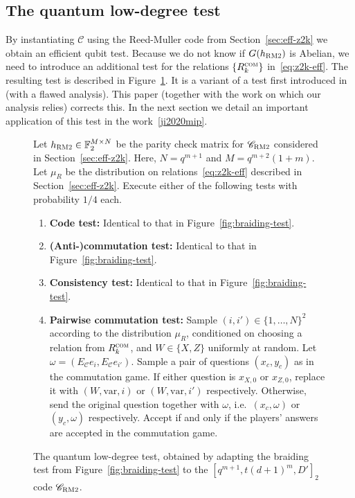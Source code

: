 \documentclass[11pt]{article}
\theoremstyle{definition}
\newcommand{\code}{\mathscr{C}}
\newcommand{\F}{\ensuremath{\mathbb{F}}}
\newcommand{\com}{\textsc{com}}
\newcommand{\bRM}{\ensuremath{\textsc{RM2}}}
\newcommand{\var}{\mathrm{var}}
\newenvironment{gamespec}{
  \begin{mdframed}[style=figstyle]}{
  \end{mdframed}}
\begin{document}
\subsection{The quantum low-degree test}
\label{sec:pbt}

By instantiating $\code$ using the Reed-Muller code from Section~\ref{sec:eff-z2k} we obtain an efficient qubit test.  Because we do not know if $G(h_\bRM)$ is Abelian, we need to introduce an additional test for the relations $\{R_k^\com\}$ in~\eqref{eq:z2k-eff}. The resulting test is described in Figure~\ref{fig:pbt}. It is a variant of a test first introduced in~\cite{natarajan2018low} (with a flawed analysis). This paper (together with the work on which our analysis relies) corrects this. In the next section we detail an important application of this test in the work~\ref{ji2020mip}.

\begin{figure}[!htbp]
  \centering
  \begin{gamespec}
Let $h_\bRM\in \F_2^{M\times N}$ be the parity check matrix for $\code_\bRM$ considered in Section~\ref{sec:eff-z2k}. Here, $N=q^{m+1}$ and $M=q^{m+2}(1+m)$. Let $\mu_R$ be the distribution on relations~\eqref{eq:z2k-eff} described in Section~\ref{sec:eff-z2k}. Execute either of the following tests with probability $1/4$ each. 
    \begin{enumerate}
      \setlength\itemsep{1pt}
    \item \textbf{Code test:} Identical to that in Figure~\ref{fig:braiding-test}.
    \item \textbf{(Anti-)commutation test:} Identical to that in Figure~\ref{fig:braiding-test}.
		 \item \textbf{Consistency test:} Identical to that in Figure~\ref{fig:braiding-test}.
		\item \textbf{Pairwise commutation test:} Sample $(i,i')\in \{1,\ldots,N\}^2$ according to the distribution $\mu_R$, conditioned on choosing a relation from $R_k^\com$, and $W\in \{X,Z\}$ uniformly at random. 	
		Let $\omega=(E_\code e_{i}, E_\code e_{i'})$. 
		Sample a pair of questions $(x_c,y_c)$ as in the commutation game. If either question is $x_{X,0}$ or $x_{Z,0}$, replace it with $(W,\var,i)$ or $(W,\var,i')$ respectively. Otherwise, send the original question together with $\omega$, i.e.\ $(x_c,\omega)$ or $(y_c,\omega)$ respectively. Accept if and only if the players' answers are accepted in the commutation game.  
    \end{enumerate}
  \end{gamespec}
  \caption{The quantum low-degree test, obtained by adapting the braiding test from Figure~\ref{fig:braiding-test} to the $[q^{m+1},t(d+1)^m,D']_2$ code $\code_\bRM$.}
  \label{fig:pbt}
	
\end{figure}
\end{document}

